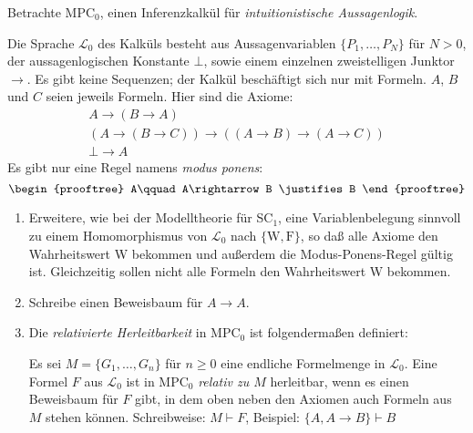 \begin{aufgabe}
  Betrachte MPC$_0$, einen Inferenzkalkül für
  \textit{intuitionistische Aussagenlogik}.
  
  Die Sprache $\mathcal{L}_0$ des Kalküls besteht aus
  Aussagenvariablen $\{P_1, \ldots, P_N\}$ für
  $N>0$, der aussagenlogischen Konstante $\bot$, sowie einem einzelnen
  zweistelligen Junktor $\rightarrow$.  Es gibt keine Sequenzen; der
  Kalkül beschäftigt sich nur mit Formeln.  $A$, $B$ und $C$ seien
  jeweils Formeln.  Hier sind die Axiome:
  \begin{displaymath}
    \begin{array}{c}
      A\rightarrow(B\rightarrow A)
      \\
      (A\rightarrow(B\rightarrow C))\rightarrow ((A\rightarrow
      B)\rightarrow (A\rightarrow C))
      \\
      \bot\rightarrow A
    \end{array}
  \end{displaymath}
  Es gibt nur eine Regel namens \textit{modus ponens}:
  \begin{displaymath}
    \begin{prooftree}
       A\qquad A\rightarrow B \justifies B
    \end{prooftree}
  \end{displaymath}
  \begin{enumerate}
  \item Erweitere, wie bei der Modelltheorie für SC$_1$, eine
    Variablenbelegung sinnvoll zu einem Homomorphismus von
    $\mathcal{L}_0$ nach $\{\mathrm{W}, \mathrm{F}\}$, so daß alle
    Axiome den Wahrheitswert W bekommen und außerdem die Modus-Ponens-Regel
    gültig ist.  Gleichzeitig sollen nicht alle Formeln den
    Wahrheitswert W bekommen.
  \item Schreibe einen Beweisbaum für $A\rightarrow
    A$.
  \item Die \textit{relativierte Herleitbarkeit} in MPC$_0$ ist
    folgendermaßen definiert:

    Es sei $M =\{G_1, \ldots, G_n\}$ für $n\geq 0$ eine endliche
    Formelmenge in $\mathcal{L}_0$.  Eine Formel $F$ aus
    $\mathcal{L}_0$ ist in MPC$_0$ \textit{relativ zu $M$} herleitbar,
    wenn es einen Beweisbaum für $F$ gibt, in dem oben neben den
    Axiomen auch Formeln aus $M$ stehen können.  Schreibweise:
    \(M \vdash F\),
    Beispiel:
    \(\{A,A\rightarrow B\} \vdash B\)


\end{enumerate}
\end{aufgabe}
